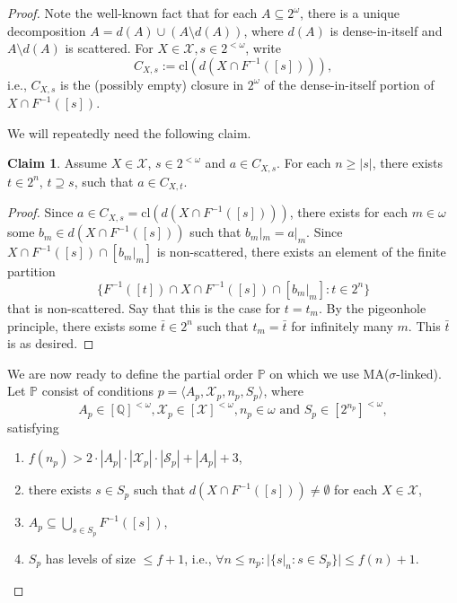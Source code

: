 \documentclass[12pt]{article}
\theoremstyle{definition}
\newtheorem{claim}[nummer]{\sc Claim}
\newcommand\cls{\text{cl}}
\begin{document}
 \begin{proof}
 Note the well-known fact that for each $A \subseteq 2^\omega$, there is a unique decomposition $A=d(A) \cup (A \setminus d(A))$, where $d(A)$ is dense-in-itself and $A \setminus d(A)$ is scattered. For $X \in \mathcal{X}, s \in 2^{<\omega}$, write
 \[C_{X,s}:=\cls\left(d(X \cap F^{-1}([s]))\right),\]
 i.e., $C_{X,s}$ is the (possibly empty) closure in $2^\omega$ of the dense-in-itself portion of $X \cap F^{-1}([s])$.
 
 We will repeatedly need the following claim.
 
 \begin{claim}\label{claim:extension}
	Assume $X \in \mathcal{X}$, $s \in 2^{<\omega}$ and $a \in C_{X,s}$. For each $n \geq |s|$, there exists $t \in 2^n$, $t \supseteq s$, such that $a \in C_{X,t}$.  
\end{claim}

\begin{proof}
Since $a \in C_{X,s}=\cls\left(d(X \cap F^{-1}([s]))\right) $, there exists for each $m \in \omega$ some $b_m \in d(X \cap F^{-1}([s]))$ such that $b_m|_m = a|_m$. Since $X \cap F^{-1}([s]) \cap [b_m|_m]$ is non-scattered, there exists an element of the finite partition
\[\{F^{-1}([t])\cap X \cap F^{-1}([s]) \cap [b_m|_m]: t \in 2^{n}\}\]
that is non-scattered. Say that this is the case for $t=t_m$. By the pigeonhole principle, there exists some $\bar t \in 2^n$ such that $t_m=\bar t$ for infinitely many $m$. This $\bar t$ is as desired.
\end{proof}
 
 We are now ready to define the partial order $\mathbb{P}$ on which we use \textsf{MA}($\sigma$-linked). Let $\mathbb{P}$ consist of conditions $p=\langle A_p, \mathcal{X}_p, n_p, S_p\rangle$, where
 \[A_p \in [\mathbb{Q}]^{<\omega}, \mathcal{X}_p \in [\mathcal{X}]^{<\omega}, n_p \in \omega \text{ and } S_p \in [2^{n_p}]^{<\omega},\]
 satisfying
 \begin{enumerate}[label=(\roman*)]
 \item $f(n_p)> 2 \cdot |A_p| \cdot |\mathcal{X}_p|\cdot |\mathcal{S}_p|+ |A_p|+3$,
 \item there exists $s \in S_p$ such that $d(X \cap F^{-1}([s]))\neq \emptyset$ for each $X \in \mathcal{X}$,
 \item $A_p \subseteq \bigcup_{s \in S_p}F^{-1}([s])$,
 \item $S_p$ has levels of size $\leq f+1$, i.e., $\forall n \leq n_p: |\{s|_n: s \in S_p\}| \leq f(n)+1$.
 \end{enumerate}


\end{proof}
\end{document}

